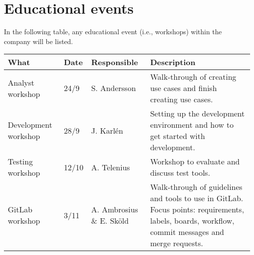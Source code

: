 \section{Educational events}
\label{sec:eduevent}
In the following table, any educational event (i.e., workshops) within the company will be listed.

\begingroup
\begin{table}[ht]
    \renewcommand{\arraystretch}{1.5}
        \begin{tabular}{|M{3.5cm}|M{1cm}|M{2.5cm}|M{6cm}|}
        \hline
        \textbf{What} & \textbf{Date} & \textbf{Responsible} & \textbf{Description} \\
        \hline
        Analyst workshop & 24/9 & S. Andersson & Walk-through of creating use cases and finish creating use cases.\\
        \hline
         Development workshop & 28/9 & J. Karlén & Setting up the development environment and how to get started with development. \\
        \hline
         Testing workshop & 12/10 & A. Telenius & Workshop to evaluate and discuss test tools.\\
        \hline
         GitLab workshop & 3/11  & A. Ambrosius \& E. Sköld & Walk-through of guidelines and tools to use in GitLab. Focus points: requirements, labels, boards, workflow, commit messages and merge requests.\\
        \hline
        \end{tabular}
\end{table}

\endgroup
